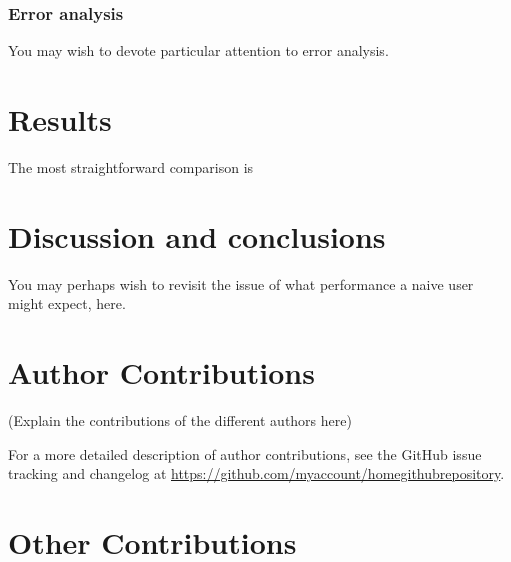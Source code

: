 \documentclass[9pt,comparison]{livecoms}
\newcommand{\githubrepository}{\url{https://github.com/myaccount/homegithubrepository}}  %
\begin{document}
\subsubsection{Error analysis}
You may wish to devote particular attention to error analysis.


\section{Results}

The most straightforward comparison is 


\section{Discussion and conclusions}

You may perhaps wish to revisit the issue of what performance a naive user might expect, here.



\section{Author Contributions}
%

(Explain the contributions of the different authors here)

For a more detailed description of author contributions,
see the GitHub issue tracking and changelog at \githubrepository.

\section{Other Contributions}
%
\end{document}
